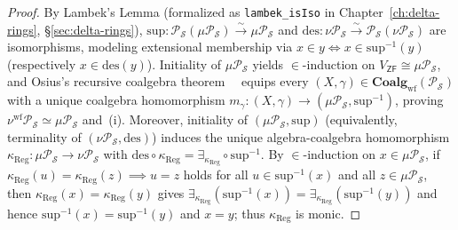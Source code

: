 \begin{proof}
By Lambek's Lemma (formalized as \texttt{lambek\_isIso} in Chapter~\ref{ch:delta-rings}, \S\ref{sec:delta-rings}), $\mathrm{sup} : \mathcal{P}_{\mathcal{S}}(\mu \mathcal{P}_{\mathcal{S}}) \xrightarrow{\sim} \mu \mathcal{P}_{\mathcal{S}}$ and $\mathrm{des} : \nu \mathcal{P}_{\mathcal{S}} \xrightarrow{\sim} \mathcal{P}_{\mathcal{S}}(\nu \mathcal{P}_{\mathcal{S}})$ are isomorphisms, modeling extensional membership via $x \in y \iff x \in \mathrm{sup}^{-1}(y)$ (respectively $x \in \mathrm{des}(y)$). Initiality of $\mu \mathcal{P}_{\mathcal{S}}$ yields $\in$-induction on $V_{\mathsf{ZF}} \cong \mu \mathcal{P}_{\mathcal{S}}$, and Osius's recursive coalgebra theorem~\cite{Osius74}~\cite[Chs.~II--III]{JoyalMoerdijk95} equips every $(X, \gamma) \in \mathbf{Coalg}_{\mathrm{wf}}(\mathcal{P}_{\mathcal{S}})$ with a unique coalgebra homomorphism $m_\gamma : (X, \gamma) \to (\mu \mathcal{P}_{\mathcal{S}}, \mathrm{sup}^{-1})$, proving $\nu^{\mathrm{wf}} \mathcal{P}_{\mathcal{S}} \simeq \mu \mathcal{P}_{\mathcal{S}}$ and~(i). Moreover, initiality of $(\mu \mathcal{P}_{\mathcal{S}}, \mathrm{sup})$ (equivalently, terminality of $(\nu \mathcal{P}_{\mathcal{S}}, \mathrm{des})$) induces the unique algebra-coalgebra homomorphism $\kappa_{\mathrm{Reg}} : \mu \mathcal{P}_{\mathcal{S}} \to \nu \mathcal{P}_{\mathcal{S}}$ with $\mathrm{des} \circ \kappa_{\mathrm{Reg}} = \exists_{\kappa_{\mathrm{Reg}}} \circ \mathrm{sup}^{-1}$. By $\in$-induction on $x \in \mu \mathcal{P}_{\mathcal{S}}$, if $\kappa_{\mathrm{Reg}}(u) = \kappa_{\mathrm{Reg}}(z) \implies u = z$ holds for all $u \in \mathrm{sup}^{-1}(x)$ and all $z \in \mu \mathcal{P}_{\mathcal{S}}$, then $\kappa_{\mathrm{Reg}}(x) = \kappa_{\mathrm{Reg}}(y)$ gives $\exists_{\kappa_{\mathrm{Reg}}}(\mathrm{sup}^{-1}(x)) = \exists_{\kappa_{\mathrm{Reg}}}(\mathrm{sup}^{-1}(y))$ and hence $\mathrm{sup}^{-1}(x) = \mathrm{sup}^{-1}(y)$ and $x = y$; thus $\kappa_{\mathrm{Reg}}$ is monic.


\end{proof}
